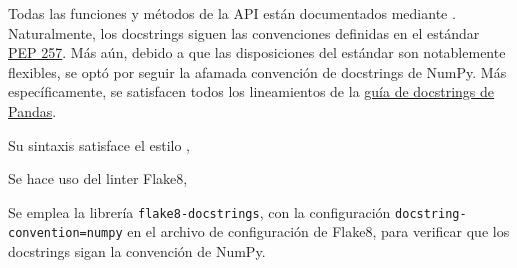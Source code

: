 
Todas las funciones y métodos de la \gls{API} están documentados mediante . Naturalmente, los docstrings siguen las convenciones definidas en el estándar \href{https://peps.python.org/pep-0257/}{\gls{PEP} 257}. Más aún, debido a que las disposiciones del estándar son notablemente flexibles, se optó por seguir la afamada convención de docstrings de \gls{NumPy}. Más específicamente, se satisfacen todos los lineamientos de la \href{https://python-sprints.github.io/pandas/guide/pandas_docstring.html}{guía de docstrings de \gls{Pandas}}.



Su sintaxis satisface el estilo , 



Se hace uso del linter \gls{Flake8}, 

Se emplea la librería \verb|flake8-docstrings|, con la configuración \verb|docstring-convention=numpy| en el archivo de configuración de Flake8, para verificar que los docstrings sigan la convención de NumPy. 
